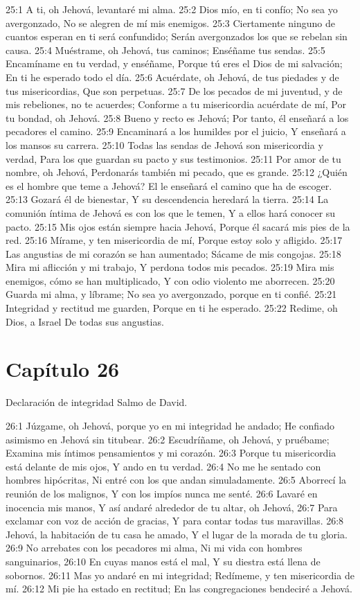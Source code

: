 25:1 A ti, oh Jehová, levantaré mi alma. 
25:2 Dios mío, en ti confío; 
No sea yo avergonzado, 
No se alegren de mí mis enemigos. 
25:3 Ciertamente ninguno de cuantos esperan en ti será confundido; 
Serán avergonzados los que se rebelan sin causa. 
25:4 Muéstrame, oh Jehová, tus caminos; 
Enséñame tus sendas. 
25:5 Encamíname en tu verdad, y enséñame, 
Porque tú eres el Dios de mi salvación; 
En ti he esperado todo el día. 
25:6 Acuérdate, oh Jehová, de tus piedades y de tus misericordias, 
Que son perpetuas. 
25:7 De los pecados de mi juventud, y de mis rebeliones, no te acuerdes; 
Conforme a tu misericordia acuérdate de mí, 
Por tu bondad, oh Jehová. 
25:8 Bueno y recto es Jehová; 
Por tanto, él enseñará a los pecadores el camino. 
25:9 Encaminará a los humildes por el juicio, 
Y enseñará a los mansos su carrera. 
25:10 Todas las sendas de Jehová son misericordia y verdad, 
Para los que guardan su pacto y sus testimonios. 
25:11 Por amor de tu nombre, oh Jehová, 
Perdonarás también mi pecado, que es grande. 
25:12 ¿Quién es el hombre que teme a Jehová? 
El le enseñará el camino que ha de escoger. 
25:13 Gozará él de bienestar, 
Y su descendencia heredará la tierra. 
25:14 La comunión íntima de Jehová es con los que le temen, 
Y a ellos hará conocer su pacto. 
25:15 Mis ojos están siempre hacia Jehová, 
Porque él sacará mis pies de la red. 
25:16 Mírame, y ten misericordia de mí, 
Porque estoy solo y afligido. 
25:17 Las angustias de mi corazón se han aumentado; 
Sácame de mis congojas. 
25:18 Mira mi aflicción y mi trabajo, 
Y perdona todos mis pecados. 
25:19 Mira mis enemigos, cómo se han multiplicado, 
Y con odio violento me aborrecen. 
25:20 Guarda mi alma, y líbrame; 
No sea yo avergonzado, porque en ti confié. 
25:21 Integridad y rectitud me guarden, 
Porque en ti he esperado. 
25:22 Redime, oh Dios, a Israel 
De todas sus angustias. 
\section*{Capítulo 26}
Declaración de integridad 
Salmo de David. 

26:1 Júzgame, oh Jehová, porque yo en mi integridad he andado; 
He confiado asimismo en Jehová sin titubear. 
26:2 Escudríñame, oh Jehová, y pruébame; 
Examina mis íntimos pensamientos y mi corazón. 
26:3 Porque tu misericordia está delante de mis ojos, 
Y ando en tu verdad. 
26:4 No me he sentado con hombres hipócritas, 
Ni entré con los que andan simuladamente. 
26:5 Aborrecí la reunión de los malignos, 
Y con los impíos nunca me senté. 
26:6 Lavaré en inocencia mis manos, 
Y así andaré alrededor de tu altar, oh Jehová, 
26:7 Para exclamar con voz de acción de gracias, 
Y para contar todas tus maravillas. 
26:8 Jehová, la habitación de tu casa he amado, 
Y el lugar de la morada de tu gloria. 
26:9 No arrebates con los pecadores mi alma, 
Ni mi vida con hombres sanguinarios, 
26:10 En cuyas manos está el mal, 
Y su diestra está llena de sobornos. 
26:11 Mas yo andaré en mi integridad; 
Redímeme, y ten misericordia de mí. 
26:12 Mi pie ha estado en rectitud; 
En las congregaciones bendeciré a Jehová. 
